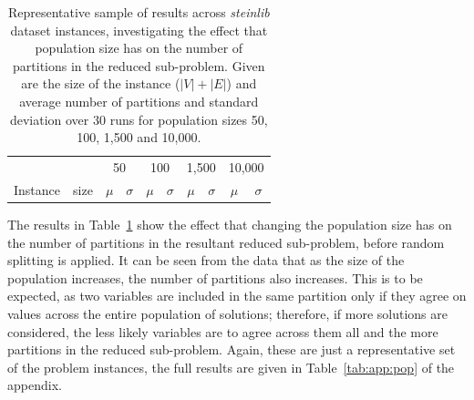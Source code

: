 \documentclass[authoryear,11pt,square,number,times,super,comma]{elsarticle}
\begin{document}
\begin{table}[t!]
\centering
\caption[Size of reduced sub-problem results]{Representative sample of results across \emph{steinlib} dataset instances, investigating the effect that population size has on the number of partitions in the reduced sub-problem. Given are the size of the instance (\(|V|+|E|\)) and average number of partitions and standard deviation over 30 runs for population sizes 50, 100, 1,500 and 10,000.}\label{tab:stpg:pop:trunc} 
\begin{adjustbox}{width=0.6\textwidth}
\begin{tabular}{lrrrrrrrrr} \toprule
 &  & \multicolumn{2}{c}{50} & \multicolumn{2}{c}{100} & \multicolumn{2}{c}{1,500} & \multicolumn{2}{c}{10,000}\\
\cmidrule(lr){3-4} \cmidrule(lr){5-6} \cmidrule(lr){7-8} \cmidrule(lr){9-10} 
Instance & size & \multicolumn{1}{c}{\(\mu\)}&\multicolumn{1}{c}{\(\sigma\)} & \multicolumn{1}{c}{\(\mu\)}&\multicolumn{1}{c}{\(\sigma\)}& \multicolumn{1}{c}{\(\mu\)}&\multicolumn{1}{c}{\(\sigma\)} & \multicolumn{1}{c}{\(\mu\)}&\multicolumn{1}{c}{\(\sigma\)}\\ \midrule
%

%
\bottomrule
\end{tabular}
\end{adjustbox}
\end{table}

The results in Table~\ref{tab:stpg:pop:trunc} show the effect that changing the population size has on the number of partitions in the resultant reduced sub-problem, before random splitting is applied. It can be seen from the data that as the size of the population increases, the number of partitions also increases. This is to be expected, as two variables are included in the same partition only if they agree on values across the entire population of solutions; therefore, if more solutions are considered, the less likely variables are to agree across them all and the more partitions in the reduced sub-problem. Again, these are just a representative set of the problem instances, the full results are given in Table~\ref{tab:app:pop} of the appendix.
\end{document}
